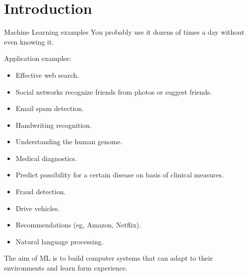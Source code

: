 \documentclass[
  9pt,
  ignorenonframetext,
  aspectratio=169,
  t, dvipsnames]{beamer}
\providecommand{\tightlist}{%
  \setlength{\itemsep}{0pt}\setlength{\parskip}{0pt}}\usepackage{longtable,booktabs,array}
\theoremstyle{definition}
\begin{document}
\hypertarget{introduction}{%
\section{Introduction}\label{introduction}}

\begin{frame}{Machine Learning examples}
\protect\hypertarget{machine-learning-examples}{}
You probably use it dozens of times a day without even knowing it.

Application examples:

\begin{itemize}
\tightlist
\item Effective web search.
\item Social networks recognize friends from photos or suggest friends.
\item Email spam detection.
\item Handwriting recognition.
\item Understanding the human genome.
\item Medical diagnostics.
\item Predict possibility for a certain disease on basis of clinical measures.
\item Fraud detection.
\item Drive vehicles.
\item Recommendations (eg, Amazon, Netflix).
\item Natural language processing.
\end{itemize}

The aim of ML is to build computer systems that can adapt to their
environments and learn form experience.
\end{frame}
\end{document}

